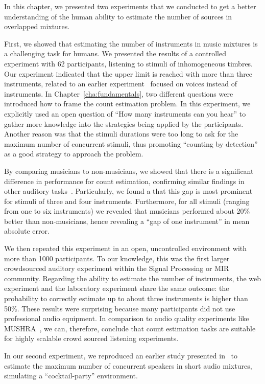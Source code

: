 In this chapter, we presented two experiments that we conducted to get a better understanding of the human ability to estimate the number of sources in overlapped mixtures.
\par
First, we showed that estimating the number of instruments in music mixtures is a challenging task for humans.
We presented the results of a controlled experiment with 62 participants, listening to stimuli of inhomogeneous timbres.
Our experiment indicated that the upper limit is reached with more than three instruments, related to an earlier experiment~\cite{huron89} focused on voices instead of instruments.
In Chapter~\ref{cha:fundamentals}, two different questions were introduced how to frame the count estimation problem.
In this experiment, we explicitly used an open question of ``How many instruments can you hear'' to gather more knowledge into the strategies being applied by the participants.
Another reason was that the stimuli durations were too long to ask for the maximum number of concurrent stimuli, thus promoting ``counting by detection'' as a good strategy to approach the problem.\par
By comparing musicians to non-musicians, we showed that there is a significant difference in performance for count estimation, confirming similar findings in other auditory tasks~\cite{kishon01}.
Particularly, we found a that this gap is most prominent for stimuli of three and four instruments.
Furthermore, for all stimuli (ranging from one to six instruments) we revealed that musicians performed about 20\% better than non-musicians, hence revealing a ``gap of one instrument'' in mean absolute error.
\par
We then repeated this experiment in an open, uncontrolled environment with more than 1000 participants.
To our knowledge, this was the first larger crowdsourced auditory experiment within the Signal Processing or MIR community.
Regarding the ability to estimate the number of instruments, the web experiment and the laboratory experiment share the same outcome: the probability to correctly estimate up to about three instruments is higher than 50\%.
These results were surprising because many participants did not use professional audio equipment.
In comparison to audio quality experiments like MUSHRA~\cite{recommendation2001MUSHRA}, we can, therefore, conclude that count estimation tasks are suitable for highly scalable crowd sourced listening experiments.
\par
In our second experiment, we reproduced an earlier study presented in~\cite{kawashima15} to estimate the maximum number of concurrent speakers in short audio mixtures, simulating a ``cocktail-party'' environment.
